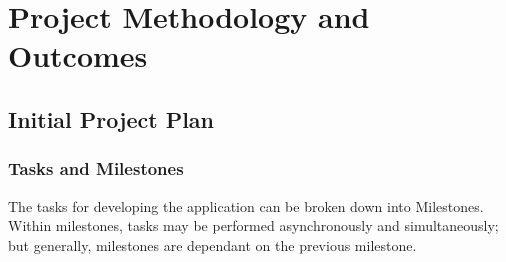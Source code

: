 \documentclass[11pt, a4paper, notitlepage]{report}
\begin{document}
\chapter{Project Methodology and Outcomes}
\section{Initial Project Plan}
\subsection{Tasks and Milestones}
The tasks for developing the application can be broken down into Milestones. 
Within milestones, tasks may be performed asynchronously and simultaneously; 
but generally, milestones are dependant on the previous milestone.
\end{document}
